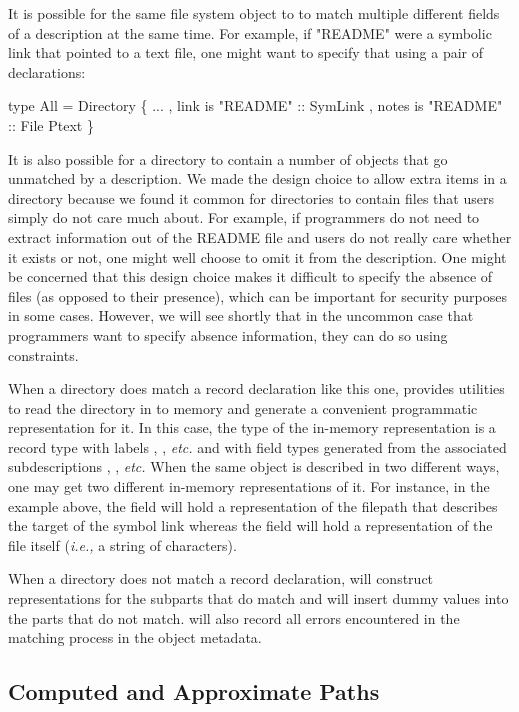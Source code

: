 It is possible for the same file system object to to match multiple different fields of a description at
the same time.  For example, if "README" were a symbolic link that pointed to a text file, one 
might want to specify that using a pair of declarations:
\begin{code}
type All = Directory
  \{ ...
  , link is "README" :: SymLink
  , notes is "README" :: File Ptext
  \}
\end{code}

It is also possible for a directory to contain a number of objects that go unmatched by
a description.  We made the design choice to allow extra items in
a directory because we found it common for directories to contain files that users
simply do not care much about.  For example,
if programmers do not need to extract information out of the README file and
users do not really care whether it exists or not, one might well choose
to omit it from the description.  One might be concerned that this design choice makes it difficult to specify
the absence of files (as opposed to their presence), which can be important
for security purposes in some cases.  However, we will see shortly that in the
uncommon case that programmers want to specify absence information, they can
do so using constraints.

When a directory does match a record declaration like this one, 
\forest{} provides utilities to read the directory in
to memory and generate a convenient programmatic representation for it.  
In this case, the type of the in-memory representation is a record type
with labels , , {\em etc.} and with field types
generated from the associated \forest{} subdescriptions , ,
{\em etc.}  When the same object is described in two different ways, one may
get two different in-memory representations of it.  For instance, in the example above,
the  field will hold a representation of the filepath that describes the target of the
symbol link whereas the  field will hold a representation of the 
file itself ({\em i.e.,} a string of characters).

When a directory does not match a record declaration, \forest{} will
construct representations for the subparts that do match and will insert dummy values
into the parts that do not match.  \forest{} will also record all errors encountered in the
matching process in the object metadata.

\subsection{Computed and Approximate Paths}
\label{sec:computed-pathes}

